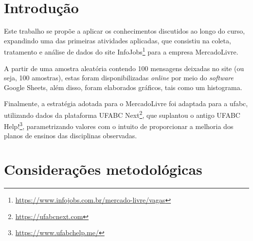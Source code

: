 	
	
	\tableofcontents 
	\textual
	
	
	
	
	\chapter{Introdução}
	
	Este trabalho se propõe a aplicar os conhecimentos discutidos ao longo do curso, expandindo uma das primeiras atividades aplicadas, que consistiu na coleta, tratamento e análise de dados do site InfoJobs\footnote{\url{https://www.infojobs.com.br/mercado-livre/vagas}} para a empresa MercadoLivre.
	
	A partir de uma amostra aleatória contendo 100 mensagens deixadas no site (ou seja, 100 amostras), estas foram disponibilizadas \textit{online} por meio do \textit{software} Google Sheets, além disso, foram elaborados gráficos, tais como um histograma.
	
	Finalmente, a estratégia adotada para o MercadoLivre foi adaptada para a \gls{ufabc}, utilizando dados da plataforma UFABC Next\footnote{\url{https://ufabcnext.com}}, que suplantou o antigo UFABC Help!\footnote{\url{https://www.ufabchelp.me/}}, parametrizando valores com o intuito de proporcionar a melhoria dos planos de ensinos das disciplinas observadas.
	
	\chapter{Considerações metodológicas}
	
